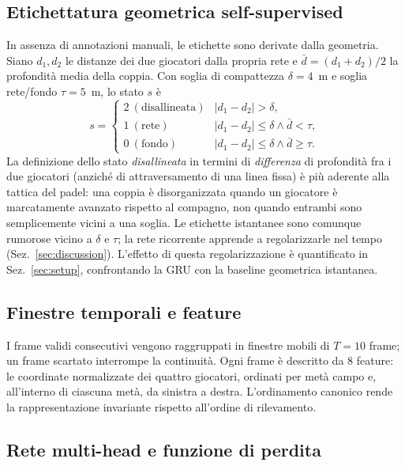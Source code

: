 \documentclass[10pt,twocolumn,a4paper]{article}
\begin{document}
	\subsection{Etichettatura geometrica self-supervised}

	In assenza di annotazioni manuali, le etichette sono derivate dalla geometria.
	Siano $d_1,d_2$ le distanze dei due giocatori dalla propria rete e
	$\bar{d}=(d_1+d_2)/2$ la profondità media della coppia. Con soglia di
	compattezza $\delta=4$~m e soglia rete/fondo $\tau=5$~m, lo stato $s$ è
	\begin{equation}
		s=\begin{cases}
			2\ (\text{disallineata}) & |d_1-d_2|>\delta,\\
			1\ (\text{rete}) & |d_1-d_2|\le\delta \wedge \bar{d}<\tau,\\
			0\ (\text{fondo}) & |d_1-d_2|\le\delta \wedge \bar{d}\ge\tau.
		\end{cases}
	\end{equation}
	La definizione dello stato \emph{disallineata} in termini di \emph{differenza}
	di profondità fra i due giocatori (anziché di attraversamento di una linea
	fissa) è più aderente alla tattica del padel: una coppia è disorganizzata
	quando un giocatore è marcatamente avanzato rispetto al compagno, non quando
	entrambi sono semplicemente vicini a una soglia. Le etichette istantanee sono
	comunque rumorose vicino a $\delta$ e $\tau$; la rete ricorrente apprende a
	regolarizzarle nel tempo (Sez.~\ref{sec:discussion}). L'effetto di questa
	regolarizzazione è quantificato in Sez.~\ref{sec:setup}, confrontando la GRU
	con la baseline geometrica istantanea.

	\subsection{Finestre temporali e feature}

	I frame validi consecutivi vengono raggruppati in finestre mobili di
	$T=10$ frame; un frame scartato interrompe la continuità. Ogni frame è
	descritto da $8$ feature: le coordinate normalizzate dei quattro giocatori,
	ordinati per metà campo e, all'interno di ciascuna metà, da sinistra a
	destra. L'ordinamento canonico rende la rappresentazione invariante rispetto
	all'ordine di rilevamento.

	\subsection{Rete multi-head e funzione di perdita}
\end{document}
